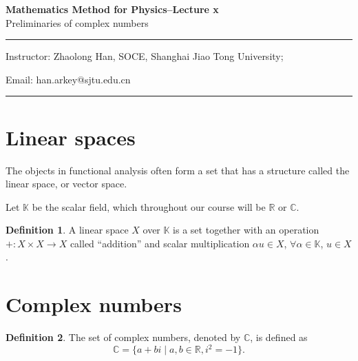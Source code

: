 \documentclass[11pt,a4paper]{article}
\theoremstyle{definition}
\newtheorem{definition}{Definition}
\theoremstyle{plain}
\begin{document}
\begin{center}
    {\LARGE \textbf{Mathematics Method for Physics--Lecture x}} \\[0.6em]
    {\large Preliminaries of complex numbers}
\end{center}

\vspace{-0.5em}
\noindent\rule{\textwidth}{0.5pt}
\vspace{0.3em}

\begin{center}
    Instructor: Zhaolong Han, SOCE, Shanghai Jiao Tong University;
\end{center}

\vspace{-0.6em}
\noindent Email: han.arkey@sjtu.edu.cn

\vspace{0.4em}
\noindent\rule{\textwidth}{0.5pt}

\vspace{0.8em}

\vspace{1.5em}

\section{Linear spaces}

The objects in functional analysis often form a set that has a structure called the linear space, or vector space.

Let $\mathbb{K}$ be the scalar field, which throughout our course will be $\mathbb{R}$ or $\mathbb{C}$.

\begin{definition}
A linear space $X$ over $\mathbb{K}$ is a set together with an operation $+: X \times X \to X$ called ``addition'' and scalar multiplication $\alpha u \in X$, $\forall \alpha \in \mathbb{K}$, $u \in X$.
\end{definition}

\section{Complex numbers}

\begin{definition}
The set of complex numbers, denoted by $\mathbb{C}$, is defined as
\[
\mathbb{C} = \{ a + bi \mid a, b \in \mathbb{R}, i^2 = -1 \}.
\]
\end{definition}
\end{document}
